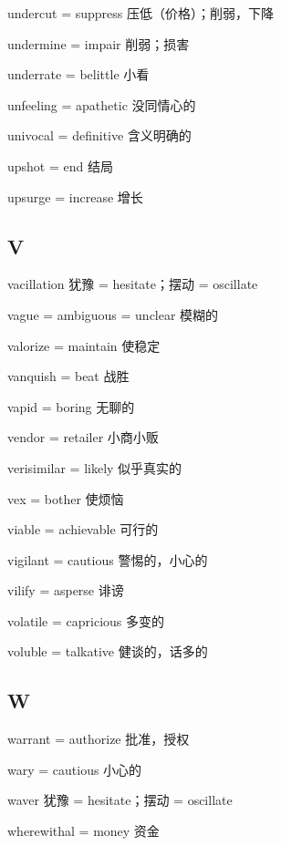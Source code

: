 \documentclass[UTF8, fontset = none, zihao = -4, linespread = 1.1]{ctexart}
\begin{document}
\begin{multicols}{2}
undercut = suppress 压低（价格）；削弱，下降

undermine = impair 削弱；损害

underrate = belittle 小看

unfeeling = apathetic 没同情心的

univocal = definitive 含义明确的

upshot = end 结局

upsurge = increase 增长

\subsection*{V}
vacillation 犹豫 = hesitate；摆动 = oscillate

vague = ambiguous = unclear 模糊的

valorize = maintain 使稳定

vanquish = beat 战胜

vapid = boring 无聊的

vendor = retailer 小商小贩

verisimilar = likely 似乎真实的

vex = bother 使烦恼

viable = achievable 可行的

vigilant = cautious 警惕的，小心的

vilify = asperse 诽谤

volatile = capricious 多变的

voluble = talkative 健谈的，话多的

\subsection*{W}
warrant = authorize 批准，授权

wary = cautious 小心的

waver 犹豫 = hesitate；摆动 = oscillate

wherewithal = money 资金

\end{multicols}
\end{document}
